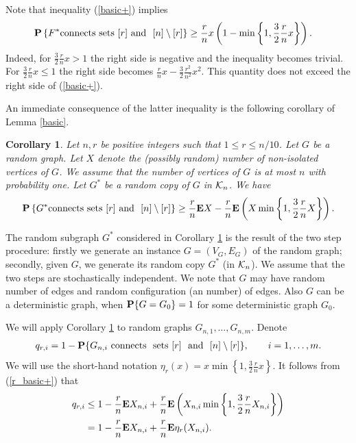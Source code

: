\documentclass[11pt, a4paper]{article}
\newcommand{\E}{{\bf{E}}}
\newcommand{\PP}{{\bf{P}}}
\newtheorem{col}{Corollary}
\begin{document}
   
 
 
 Note that inequality (\ref{basic+}) implies 
 \begin{align*}
 \PP\left\{
F^* {\text{connects   sets\ }} [r] {\text{\ and \ }} [n]\setminus[r]
\right\}
&
\ge 
\frac{r}{n}x
\left(
1
-
\min
\left\{
1,\frac{3}{2}\frac{r}{n}x
\right\}
\right).
\end{align*}
Indeed, for $\frac{3}{2}\frac{r}{n}x> 1$ the right side is negative and the inequality becomes trivial.
For $\frac{3}{2}\frac{r}{n}x\le 1$ the right side 
becomes $\frac{r}{n}x-\frac{3}{2}\frac{r^2}{n^2}x^2$. This quantity does not exceed the right side of (\ref{basic+}).

% 
An immediate consequence of the latter inequality is the  following corollary  of Lemma \ref{basic}.
 
 \begin{col}\label{r_basic}
 Let $n, r$ be positive integers such that  
 $1\le r\le n/10$. 
Let $G$ be a random graph. Let $X$ denote the (possibly random) number of non-isolated vertices of $G$. We assume that the number of vertices of $G$ is at most
 $n$ 
with probability one. Let $G^*$ be a random copy of $G$ in ${\cal K}_n$.  We have
\begin{align}
\label{r_basic+}
\PP\left\{
G^* {\text{connects   sets\ }} [r] {\text{\ and \ }} [n]\setminus[r]
\right\}
\ge 
\frac{r}{n}
\E X
-
\frac{r}{n}
\E \left(
X
\min\left\{
1,\frac{3}{2}
\frac{r}{n}X
\right\}
\right).
\end{align}
 \end{col}
The random subgraph $G^*$ considered in Corollary \ref{r_basic} is the result of the two step procedure:
firstly we generate an instance $G=(V_G,E_G)$ of the random graph; secondly, given $G$, we generate its random copy $G^*$
(in ${\cal K}_n$). We assume that the two steps are stochastically independent. We note that  $G$  may have random number of edges and random configuration (an number) of edges. Also $G$ can be a deterministic graph,
when $\PP\{G=G_0\}=1$ for some deterministic graph $G_0$. 

We will apply Corollary \ref{r_basic} to random graphs
$G_{n,1},\dots, G_{n,m}$. Denote
\begin{align*}
q_{r,i}
=
1
-
\PP\{
G_{n,i} {\text{\ connects \ sets\ }} [r] {\text{ \ and \ }} [n]\setminus[r]\},
\qquad
i=1,\dots, m.
\end{align*} 
We will use  the short-hand notation
$\eta_r(x)=
x
\min\left\{
1,\frac{3}{2}
\frac{r}{n}x
\right\}$.
It follows from (\ref{r_basic+})  that
\begin{align}
\nonumber
q_{r,i}
&
\le
1
-
\frac{r}{n}
\E X_{n,i}
+
\frac{r}{n}\E
\left(
X_{n,i}
\min\left\{
1,\frac{3}{2}
\frac{r}{n}X_{n,i}
\right\}
\right)
\\
\label{q++}
&
=
1
-
\frac{r}{n}
\E X_{n,i}
+
\frac{r}{n}\E \eta_r(X_{n,i}).
\end{align} 
\end{document}

